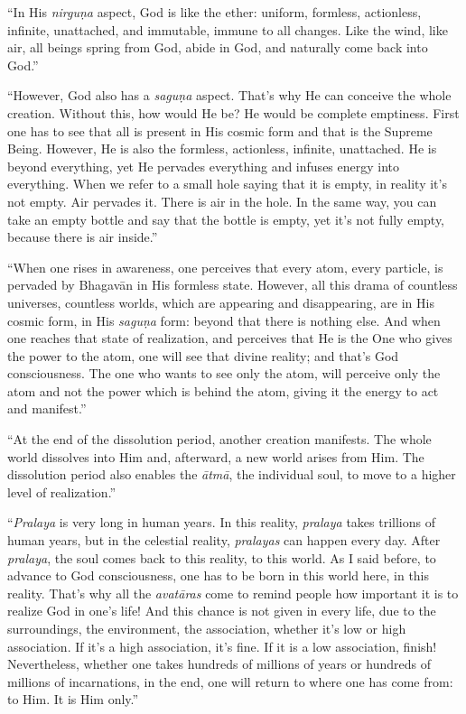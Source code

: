 \documentclass[12pt, twoside, openright]{memoir}
\begin{document}
\enquote{In His \textit{nirguṇa} aspect, God is like the ether: uniform, formless, actionless, infinite, unattached, and immutable, immune to all changes. Like the wind, like air, all beings spring from God, abide in God, and naturally come back into God.}

\enquote{However, God also has a \textit{saguṇa} aspect. That’s why He can conceive the whole creation. Without this, how would He be? He would be complete emptiness. First one has to see that all is present in His cosmic form and that is the Supreme Being. However, He is also the formless, actionless, infinite, unattached. He is beyond everything, yet He pervades everything and infuses energy into everything. When we refer to a small hole saying that it is empty, in reality it’s not empty. Air pervades it. There is air in the hole. In the same way, you can take an empty bottle and say that the bottle is empty, yet it’s not fully empty, because there is air inside.}

\enquote{When one rises in awareness, one perceives that every atom, every particle, is pervaded by Bhagavān in His formless state. However, all this drama of countless universes, countless worlds, which are appearing and disappearing, are in His cosmic form, in His \textit{saguṇa} form: beyond that there is nothing else. And when one reaches that state of realization, and perceives that He is the One who gives the power to the atom, one will see that divine reality; and that’s God consciousness. The one who wants to see only the atom, will perceive only the atom and not the power which is behind the atom, giving it the energy to act and manifest.}

\enquote{At the end of the dissolution period, another creation manifests. The whole world dissolves into Him and, afterward, a new world arises from Him. The dissolution period also enables the \textit{ātmā}, the individual soul, to move to a higher level of realization.}

\enquote{\textit{Pralaya} is very long in human years. In this reality, \textit{pralaya} takes trillions of human years, but in the celestial reality, \textit{pralayas} can happen every day. After \textit{pralaya}, the soul comes back to this reality, to this world. As I said before, to advance to God consciousness, one has to be born in this world here, in this reality. That’s why all the \textit{avatāras} come to remind people how important it is to realize God in one’s life! And this chance is not given in every life, due to the surroundings, the environment, the association, whether it’s low or high association. If it’s a high association, it’s fine. If it is a low association, finish! Nevertheless, whether one takes hundreds of millions of years or hundreds of millions of incarnations, in the end, one will return to where one has come from: to Him. It is Him only.}
\end{document}
